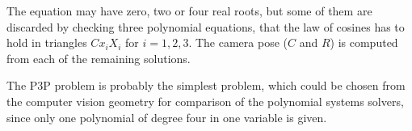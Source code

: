 The equation  may have zero, two or four real roots, but some of them are discarded by checking three polynomial equations, that the law of cosines has to hold in triangles $Cx_iX_i$ for $i=1,2,3$.
The camera pose ($C$ and $R$) is computed from each of the remaining solutions.

The P3P problem is probably the simplest problem, which could be chosen from the computer vision geometry for comparison of the polynomial systems solvers, since only one polynomial of degree four in one variable is given.
